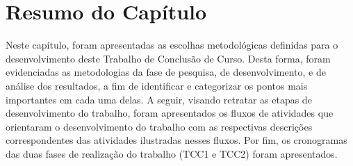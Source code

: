 \section{Resumo do Capítulo}
\label{sec:resumo_metodologia}
Neste capítulo, foram apresentadas as escolhas metodológicas definidas para o desenvolvimento deste Trabalho de Conclusão de Curso. Desta forma, foram evidenciadas as metodologias da fase de pesquisa, de desenvolvimento, e de análise dos resultados, a fim de identificar e categorizar os pontos mais importantes em cada uma delas. A seguir, visando retratar as etapas de desenvolvimento do trabalho, foram apresentados os fluxos de atividades que orientaram o desenvolvimento do trabalho com as respectivas descrições correspondentes das atividades ilustradas nesses fluxos. Por fim, os cronogramas das duas fases de realização do trabalho (TCC1 e TCC2) foram apresentados.